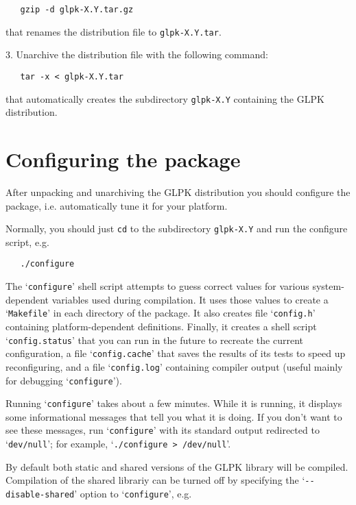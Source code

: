 \begin{verbatim}
   gzip -d glpk-X.Y.tar.gz
\end{verbatim}

\noindent
that renames the distribution file to \verb|glpk-X.Y.tar|.

\medskip

3. Unarchive the distribution file with the following command:

\begin{verbatim}
   tar -x < glpk-X.Y.tar
\end{verbatim}

\noindent
that automatically creates the subdirectory \verb|glpk-X.Y| containing
the GLPK distribution.


\section{Configuring the package}

After unpacking and unarchiving the GLPK distribution you should
configure the package, i.e. automatically tune it for your platform.

Normally, you should just \verb|cd| to the subdirectory
\verb|glpk-X.Y| and run the configure script, e.g.

\begin{verbatim}
   ./configure
\end{verbatim}

The `\verb|configure|' shell script attempts to guess correct values
for various system-dependent variables used during compilation. It uses
those values to create a `\verb|Makefile|' in each directory of the
package. It also creates file `\verb|config.h|' containing
platform-dependent definitions. Finally, it creates a shell script
`\verb|config.status|' that you can run in the future to recreate the
current configuration, a file `\verb|config.cache|' that saves the
results of its tests to speed up reconfiguring, and a file
`\verb|config.log|' containing compiler output (useful mainly for
debugging `\verb|configure|').

Running `\verb|configure|' takes about a few minutes. While it is
running, it displays some informational messages that tell you what it
is doing. If you don't want to see these messages, run
`\verb|configure|' with its standard output redirected to
`\verb|dev/null|'; for example, `\verb|./configure > /dev/null|'.

By default both static and shared versions of the GLPK library will be
compiled. Compilation of the shared librariy can be turned off by
specifying the `\verb|--disable-shared|' option to `\verb|configure|',
e.g.

